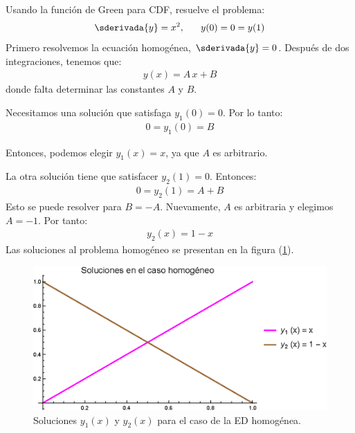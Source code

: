 \begin{ejemplo}
Usando la función de Green para CDF, resuelve el problema:
\begin{align*}
\sderivada{y} = x^{2}, \hspace{0.6cm} y (0) = 0 = y (1)
\end{align*}
Primero resolvemos la ecuación homogénea, $\sderivada{y} = 0$. Después de dos integraciones, tenemos que:
\begin{align*}
y (x) = A \, x + B
\end{align*}
donde falta determinar las constantes $A$ y $B$.
\par
Necesitamos una solución que satisfaga $y_{1} (0) = 0$. Por lo tanto:
\begin{align*}
0 = y_{1} (0) = B
\end{align*}

\end{ejemplo}
Entonces, podemos elegir $y_{1} (x) = x$, ya que $A$ es arbitrario.
\par
La otra solución tiene que satisfacer $y_{2} (1) = 0$. Entonces:
\begin{align*}
0 = y_{2} (1) = A + B
\end{align*}
Esto se puede resolver para $B = - A$. Nuevamente, $A$ es arbitraria y elegimos $A = - 1$. Por tanto:
\begin{align*}
y_{2} (x) = 1 - x
\end{align*}
Las soluciones al problema homogéneo se presentan en la figura (\ref{fig:figura_03}).
\begin{figure}[H]
    \centering
    \includegraphics[scale=1]{Imagenes/Plot_EDONH_Green_01.eps}
    \caption{Soluciones $y_{1} (x)$ y $y_{2} (x)$ para el caso de la ED homogénea.}
    \label{fig:figura_03}
\end{figure}

